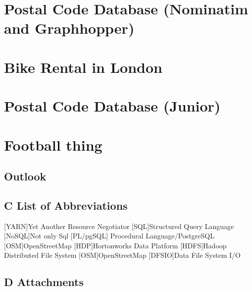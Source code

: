 \documentclass[12pt]{report}
\renewcommand{\listfigurename}{\begingroup
    \tocchapter{}
    \tocfile{\listoffigurename}{B Illustration Directory}
\endgroup}
\begin{document}
\chapter{Postal Code Database (Nominatim and Graphhopper)}





\chapter{Bike Rental in London}




\chapter{Postal Code Database (Junior)}


\chapter{Football thing}
\section{Outlook}

\newpage


\renewcommand{\listfigurename}{B Illustration Directory}
\listoffigures
\section*{C List of Abbreviations}
\begin{acronym}
    [YARN]{Yet Another Resource Negotiator}
     [SQL]{Structured Query Language}
     [NoSQL]{Not only Sql}
    [PL/pgSQL] {Procedural Language/PostgreSQL}
    [OSM]{OpenStreetMap}
    [HDP]{Hortonworks Data Platform}
     [HDFS]{Hadoop Distributed File System}
    [OSM]{OpenStreetMap}
    [DFSIO]{Data File System I/O}
\end{acronym}
\newpage
\section*{D Attachments}
\end{document}
